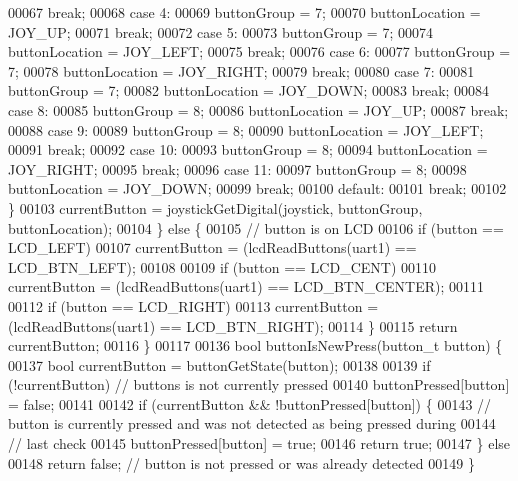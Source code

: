 \begin{DoxyCode}
00067       \textcolor{keywordflow}{break};
00068     \textcolor{keywordflow}{case} 4:
00069       buttonGroup = 7;
00070       buttonLocation = JOY\_UP;
00071       \textcolor{keywordflow}{break};
00072     \textcolor{keywordflow}{case} 5:
00073       buttonGroup = 7;
00074       buttonLocation = JOY\_LEFT;
00075       \textcolor{keywordflow}{break};
00076     \textcolor{keywordflow}{case} 6:
00077       buttonGroup = 7;
00078       buttonLocation = JOY\_RIGHT;
00079       \textcolor{keywordflow}{break};
00080     \textcolor{keywordflow}{case} 7:
00081       buttonGroup = 7;
00082       buttonLocation = JOY\_DOWN;
00083       \textcolor{keywordflow}{break};
00084     \textcolor{keywordflow}{case} 8:
00085       buttonGroup = 8;
00086       buttonLocation = JOY\_UP;
00087       \textcolor{keywordflow}{break};
00088     \textcolor{keywordflow}{case} 9:
00089       buttonGroup = 8;
00090       buttonLocation = JOY\_LEFT;
00091       \textcolor{keywordflow}{break};
00092     \textcolor{keywordflow}{case} 10:
00093       buttonGroup = 8;
00094       buttonLocation = JOY\_RIGHT;
00095       \textcolor{keywordflow}{break};
00096     \textcolor{keywordflow}{case} 11:
00097       buttonGroup = 8;
00098       buttonLocation = JOY\_DOWN;
00099       \textcolor{keywordflow}{break};
00100     \textcolor{keywordflow}{default}:
00101       \textcolor{keywordflow}{break};
00102     \}
00103     currentButton = joystickGetDigital(joystick, buttonGroup, buttonLocation);
00104   \} \textcolor{keywordflow}{else} \{
00105     \textcolor{comment}{// button is on LCD}
00106     \textcolor{keywordflow}{if} (button == LCD_LEFT)
00107       currentButton = (lcdReadButtons(uart1) == LCD\_BTN\_LEFT);
00108 
00109     \textcolor{keywordflow}{if} (button == LCD_CENT)
00110       currentButton = (lcdReadButtons(uart1) == LCD\_BTN\_CENTER);
00111 
00112     \textcolor{keywordflow}{if} (button == LCD_RIGHT)
00113       currentButton = (lcdReadButtons(uart1) == LCD\_BTN\_RIGHT);
00114   \}
00115   \textcolor{keywordflow}{return} currentButton;
00116 \}
00117 
00136 \textcolor{keywordtype}{bool} buttonIsNewPress(button_t button) \{
00137   \textcolor{keywordtype}{bool} currentButton = buttonGetState(button);
00138 
00139   \textcolor{keywordflow}{if} (!currentButton) \textcolor{comment}{// buttons is not currently pressed}
00140     buttonPressed[button] = \textcolor{keyword}{false};
00141 
00142   \textcolor{keywordflow}{if} (currentButton && !buttonPressed[button]) \{
00143     \textcolor{comment}{// button is currently pressed and was not detected as being pressed during}
00144     \textcolor{comment}{// last check}
00145     buttonPressed[button] = \textcolor{keyword}{true};
00146     \textcolor{keywordflow}{return} \textcolor{keyword}{true};
00147   \} \textcolor{keywordflow}{else}
00148     \textcolor{keywordflow}{return} \textcolor{keyword}{false}; \textcolor{comment}{// button is not pressed or was already detected}
00149 \}
\end{DoxyCode}
